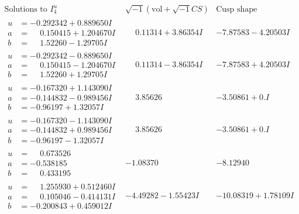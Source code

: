 \documentclass[1p]{elsarticle_modified}
\theoremstyle{definition}
\newcommand{\I}{\sqrt{-1}}
\begin{document}
$$\begin{array}{c|c|c}  
\text{Solutions to }I^u_{4}& \I (\text{vol} + \sqrt{-1}CS) & \text{Cusp shape}\\
 \hline 
\begin{aligned}
u &= -0.292342 + 0.889650 I \\
a &= \phantom{-}0.150415 + 1.204670 I \\
b &= \phantom{-}1.52260 - 1.29705 I\end{aligned}
 & \phantom{-}0.11314 + 3.86354 I & -7.87583 - 4.20503 I \\ \hline\begin{aligned}
u &= -0.292342 - 0.889650 I \\
a &= \phantom{-}0.150415 - 1.204670 I \\
b &= \phantom{-}1.52260 + 1.29705 I\end{aligned}
 & \phantom{-}0.11314 - 3.86354 I & -7.87583 + 4.20503 I \\ \hline\begin{aligned}
u &= -0.167320 + 1.143090 I \\
a &= -0.144832 - 0.989456 I \\
b &= -0.96197 + 1.32057 I\end{aligned}
 & \phantom{-}3.85626\phantom{ +0.000000I} & -3.50861 + 0. I\phantom{ +0.000000I} \\ \hline\begin{aligned}
u &= -0.167320 - 1.143090 I \\
a &= -0.144832 + 0.989456 I \\
b &= -0.96197 - 1.32057 I\end{aligned}
 & \phantom{-}3.85626\phantom{ +0.000000I} & -3.50861 + 0. I\phantom{ +0.000000I} \\ \hline\begin{aligned}
u &= \phantom{-}0.673526\phantom{ +0.000000I} \\
a &= -0.538185\phantom{ +0.000000I} \\
b &= \phantom{-}0.433195\phantom{ +0.000000I}\end{aligned}
 & -1.08370\phantom{ +0.000000I} & -8.12940\phantom{ +0.000000I} \\ \hline\begin{aligned}
u &= \phantom{-}1.255930 + 0.512460 I \\
a &= \phantom{-}0.105046 - 0.414131 I \\
b &= -0.200843 + 0.459012 I\end{aligned}
 & -4.49282 - 1.55423 I & -10.08319 + 1.78109 I \\ \hline\begin{aligned}

\end{aligned}
\end{array}$$
\end{document}
